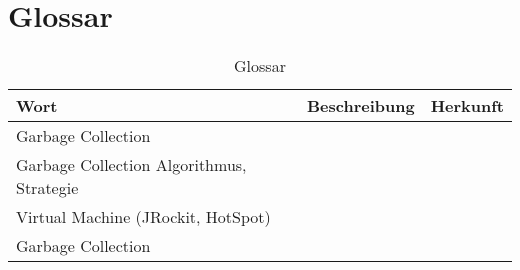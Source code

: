 \chapter*{Glossar}\label{glossar}
  \begin{longtable}{|p{3cm}|p{7cm}|p{4cm}|}
      \caption{Glossar}\\
\hline
  \textbf{Wort} & \textbf{Beschreibung} & \textbf{Herkunft}\\\hline
  Garbage Collection & & \\\hline
  Garbage Collection Algorithmus, Strategie & & \\\hline
  Virtual Machine (JRockit, HotSpot) & & \\\hline
  Garbage Collection & & \\\hline
  \end{longtable}


